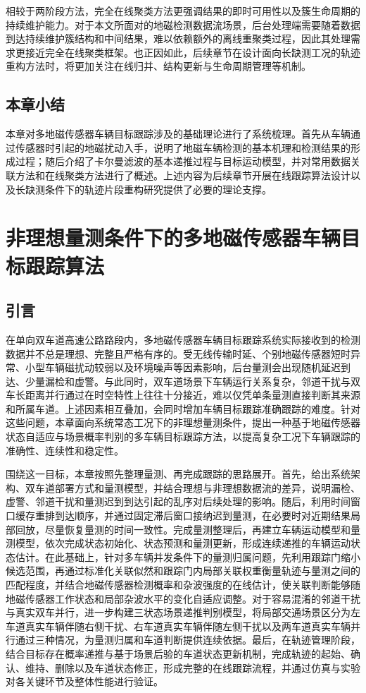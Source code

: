\documentclass{xdupgthesis}
\begin{document}
相较于两阶段方法，完全在线聚类方法更强调结果的即时可用性以及簇生命周期的持续维护能力。对于本文所面对的地磁检测数据流场景，后台处理端需要随着数据到达持续维护簇结构和中间结果，难以依赖额外的离线重聚类过程，因此其处理需求更接近完全在线聚类框架。也正因如此，后续章节在设计面向长缺测工况的轨迹重构方法时，将更加关注在线归并、结构更新与生命周期管理等机制。


\section{本章小结}
本章对多地磁传感器车辆目标跟踪涉及的基础理论进行了系统梳理。首先从车辆通过传感器时引起的地磁扰动入手，说明了地磁车辆检测的基本机理和检测结果的形成过程；随后介绍了卡尔曼滤波的基本递推过程与目标运动模型，并对常用数据关联方法和在线聚类方法进行了概述。上述内容为后续章节开展在线跟踪算法设计以及长缺测条件下的轨迹片段重构研究提供了必要的理论支撑。


\chapter{非理想量测条件下的多地磁传感器车辆目标跟踪算法}
\label{chap:online_tracking}

\section{引言}

在单向双车道高速公路路段内，多地磁传感器车辆目标跟踪系统实际接收到的检测数据并不总是理想、完整且严格有序的。受无线传输时延、个别地磁传感器短时异常、小型车辆磁扰动较弱以及环境噪声等因素影响，后台量测会出现随机延迟到达、少量漏检和虚警。与此同时，双车道场景下车辆运行关系复杂，邻道干扰与双车长距离并行通过在时空特性上往往十分接近，难以仅凭单条量测直接判断其来源和所属车道。上述因素相互叠加，会同时增加车辆目标跟踪准确跟踪的难度。针对这些问题，本章面向系统常态工况下的非理想量测条件，提出一种基于地磁传感器状态自适应与场景概率判别的多车辆目标跟踪方法，以提高复杂工况下车辆跟踪的准确性、连续性和稳定性。 

围绕这一目标，本章按照先整理量测、再完成跟踪的思路展开。首先，给出系统架构、双车道部署方式和量测模型，并结合理想与非理想数据流的差异，说明漏检、虚警、邻道干扰和量测迟到到达引起的乱序对后续处理的影响。随后，利用时间窗口缓存重排到达顺序，并通过固定滞后窗口接纳迟到量测，在必要时对近期结果局部回放，尽量恢复量测的时间一致性。完成量测整理后，再建立车辆运动模型和量测模型，依次完成状态初始化、状态预测和量测更新，形成连续递推的车辆运动状态估计。在此基础上，针对多车辆并发条件下的量测归属问题，先利用跟踪门缩小候选范围，再通过标准化关联似然和跟踪门内局部关联权重衡量轨迹与量测之间的匹配程度，并结合地磁传感器检测概率和杂波强度的在线估计，使关联判断能够随地磁传感器工作状态和局部杂波水平的变化自适应调整。对于容易混淆的邻道干扰与真实双车并行，进一步构建三状态场景递推判别模型，将局部交通场景区分为左车道真实车辆伴随右侧干扰、右车道真实车辆伴随左侧干扰以及两车道真实车辆并行通过三种情况，为量测归属和车道判断提供连续依据。最后，在轨迹管理阶段，结合目标存在概率递推与基于场景后验的车道状态更新机制，完成轨迹的起始、确认、维持、删除以及车道状态修正，形成完整的在线跟踪流程，并通过仿真与实验对各关键环节及整体性能进行验证。
\end{document}
